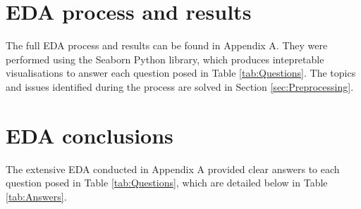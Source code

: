 \documentclass[12pt]{report}
\begin{document}
\section{EDA process and results}
The full EDA process and results can be found in Appendix A. They were performed using the Seaborn Python library,
which produces intepretable visualisations to answer each question posed in Table \ref{tab:Questions}. The topics and issues identified
during the process are solved in Section \ref{sec:Preprocessing}.


\section{EDA conclusions}
The extensive EDA conducted in Appendix A provided clear answers to each question posed in Table \ref{tab:Questions}, 
which are detailed below in Table \ref{tab:Answers}.
\end{document}
